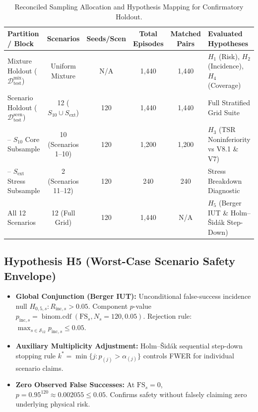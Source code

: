 \documentclass[10pt,a4paper]{article}
\begin{document}
\begin{table}[h!]
\centering
\small
\begin{tabularx}{\textwidth}{l c c c c X}
\toprule
\textbf{Partition / Block} & \textbf{Scenarios} & \textbf{Seeds/Scen} & \textbf{Total Episodes} & \textbf{Matched Pairs} & \textbf{Evaluated Hypotheses} \\
\midrule
Mixture Holdout ($\mathcal{D}_{\text{test}}^{\text{mix}}$) & Uniform Mixture & N/A & 1,440 & 1,440 & $H_1$ (Risk), $H_2$ (Incidence), $H_4$ (Coverage) \\
Scenario Holdout ($\mathcal{D}_{\text{test}}^{\text{scen}}$) & 12 ($S_{10} \cup S_{\text{ext}}$) & 120 & 1,440 & 1,440 & Full Stratified Grid Suite \\
-- $S_{10}$ Core Subsample & 10 (Scenarios 1--10) & 120 & 1,200 & 1,200 & $H_3$ (TSR Noninferiority vs V8.1 \& V7) \\
-- $S_{\text{ext}}$ Stress Subsample & 2 (Scenarios 11--12) & 120 & 240 & 240 & Stress Breakdown Diagnostic \\
All 12 Scenarios & 12 (Full Grid) & 120 & 1,440 & N/A & $H_5$ (Berger IUT \& Holm--Šidák Step-Down) \\
\bottomrule
\end{tabularx}
\caption{Reconciled Sampling Allocation and Hypothesis Mapping for Confirmatory Holdout.}
\end{table}

\subsection{Hypothesis H5 (Worst-Case Scenario Safety Envelope)}
\begin{itemize}
    \item \textbf{Global Conjunction (Berger IUT):} Unconditional false-success incidence null $H_{0,5,s}: R_{\mathrm{inc}, s} > 0.05$. Component $p$-value $p_{\mathrm{inc}, s} = \operatorname{binom.cdf}(\mathrm{FS}_s, N_s=120, 0.05)$. Rejection rule: $\max_{s \in \mathcal{S}_{12}} p_{\mathrm{inc}, s} \le 0.05$.
    \item \textbf{Auxiliary Multiplicity Adjustment:} Holm--Šidák sequential step-down stopping rule $k^* = \min \{ j : p_{(j)} > \alpha_{(j)} \}$ controls FWER for individual scenario claims.
    \item \textbf{Zero Observed False Successes:} At $\mathrm{FS}_s = 0$, $p = 0.95^{120} \approx 0.002055 \le 0.05$. Confirms safety without falsely claiming zero underlying physical risk.
\end{itemize}
\end{document}

